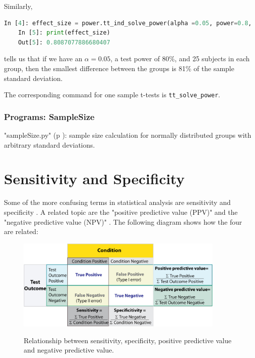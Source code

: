Similarly,

\begin{lstlisting}[language=Python]
    In [4]: effect_size = power.tt_ind_solve_power(alpha =0.05, power=0.8, nobs1=25)
    In [5]: print(effect_size)
    Out[5]: 0.8087077886680407
\end{lstlisting}

tells us that if we have an $\alpha=0.05$, a test power of $80\%$, and 25 subjects in each group, then the smallest difference between the groups is 81\% of the sample standard deviation.

The corresponding command for one sample t-tests is \lstinline{tt_solve_power}.

\subsubsection{Programs: SampleSize}

\PyImg "sampleSize.py" (p \pageref{py:sampleSize}): sample size calculation for normally distributed groups with arbitrary standard deviations.


\section{Sensitivity and Specificity}

Some of the more confusing terms in statistical analysis are \gls{sensitivity}  and \gls{specificity} . A related topic are the "positive predictive value (PPV)"  and the "negative predictive value (NPV)" . The following diagram shows how the four are related:

\begin{figure}[ht]
  \centering
  \includegraphics[width=0.9\textwidth]{../Images/Sensitivity_Specificity_Diagram.jpg}\\
  \caption{Relationship between sensitivity, specificity, positive predictive value and negative predictive value.}\label{fig:sens_spec_diagram}
\end{figure}

